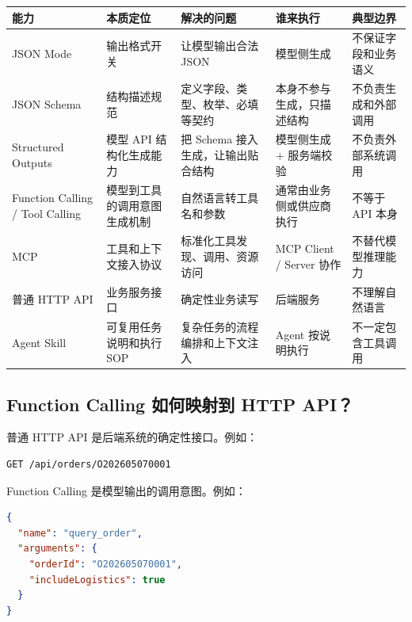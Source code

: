 \documentclass[9pt,a4paper,twocolumn]{ctexart}
\begin{document}
{\footnotesize
\begin{tabular}{|p{}|p{}|p{}|p{}|p{}|}
\hline
\textbf{能力} & \textbf{本质定位} & \textbf{解决的问题} & \textbf{谁来执行} & \textbf{典型边界} \\
\hline
JSON Mode & 输出格式开关 & 让模型输出合法 JSON & 模型侧生成 & 不保证字段和业务语义 \\
\hline
JSON Schema & 结构描述规范 & 定义字段、类型、枚举、必填等契约 & 本身不参与生成，只描述结构 & 不负责生成和外部调用 \\
\hline
Structured Outputs & 模型 API 结构化生成能力 & 把 Schema 接入生成，让输出贴合结构 & 模型侧生成 + 服务端校验 & 不负责外部系统调用 \\
\hline
Function Calling / Tool Calling & 模型到工具的调用意图生成机制 & 自然语言转工具名和参数 & 通常由业务侧或供应商执行 & 不等于 API 本身 \\
\hline
MCP & 工具和上下文接入协议 & 标准化工具发现、调用、资源访问 & MCP Client / Server 协作 & 不替代模型推理能力 \\
\hline
普通 HTTP API & 业务服务接口 & 确定性业务读写 & 后端服务 & 不理解自然语言 \\
\hline
Agent Skill & 可复用任务说明和执行 SOP & 复杂任务的流程编排和上下文注入 & Agent 按说明执行 & 不一定包含工具调用 \\
\hline
\end{tabular}
}



\subsection*{Function Calling 如何映射到 HTTP API？}


普通 HTTP API 是后端系统的确定性接口。例如：



\begin{lstlisting}[language=http]
GET /api/orders/O202605070001
\end{lstlisting}



Function Calling 是模型输出的调用意图。例如：



\begin{lstlisting}[language=json]
{
  "name": "query_order",
  "arguments": {
    "orderId": "O202605070001",
    "includeLogistics": true
  }
}
\end{lstlisting}
\end{document}
